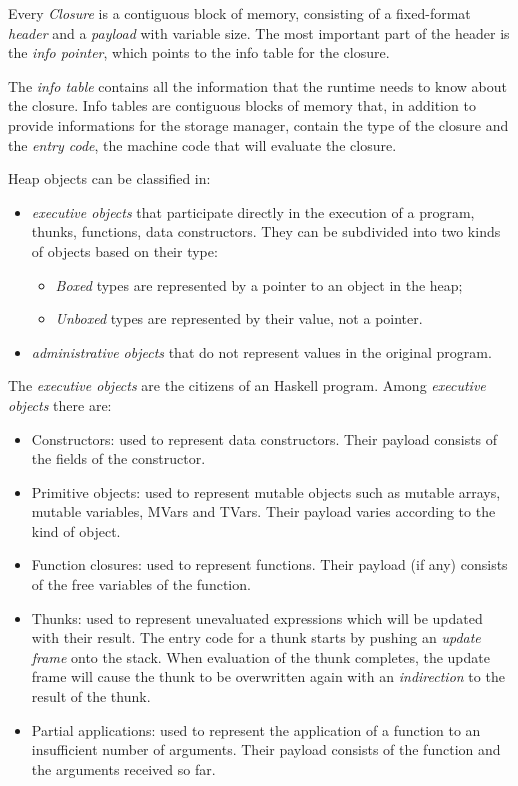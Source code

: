 Every \emph{Closure} is a contiguous block of memory, consisting of a fixed-format \emph{header} and a \emph{payload} with variable size.
The most important part of the header is the \emph{info pointer},  which points to the info table for the closure.

The \emph{info table} contains all the information that the runtime needs to know about the closure.
Info tables are contiguous blocks of memory that, in addition to provide informations for the storage manager, contain the type of the closure and the \emph{entry code}, \ie the machine code that will evaluate the closure.

Heap objects can be classified in:
\begin{itemize}
\item \emph{executive objects} that participate directly in the execution of a program, \eg thunks, functions, data constructors. They can be subdivided into two kinds of objects based on their type:
\begin{itemize}
\item \emph{Boxed} types are represented by a pointer to an object in the heap;
\item \emph{Unboxed} types are represented by their value, not a pointer.
\end{itemize}
\item \emph{administrative objects} that do not represent values in the original program.
\end{itemize}

The \emph{executive objects} are the citizens of an Haskell program. Among \emph{executive objects} there are:
\begin{itemize}
\item Constructors: used to represent data constructors. Their payload consists of the fields of the constructor.
\item Primitive objects: used to represent mutable objects such as mutable arrays, mutable variables, MVars and TVars. Their payload varies according to the kind of object.
\item Function closures: used to represent functions. Their payload (if any) consists of the free variables of the function.
\item Thunks: used to represent unevaluated expressions which will be updated with their result. The entry code for a thunk starts by pushing an \emph{update frame} onto the stack. When evaluation of the thunk completes, the update frame will cause the thunk to be overwritten again with an \emph{indirection} to the result of the thunk.
\item Partial applications: used to represent the application of a function to an insufficient number of arguments. Their payload consists of the function and the arguments received so far.
\end{itemize}


